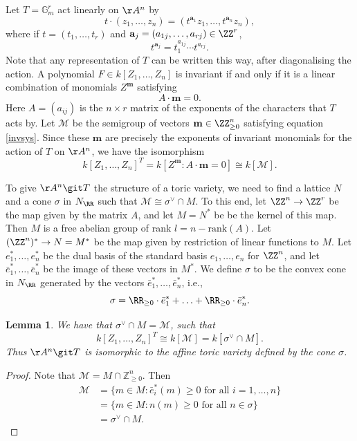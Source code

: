 \documentclass[12pt]{amsart}
\newcommand{\todo}[1]{\noindent  \textcolor{blue}{To do: #1}}
\theoremstyle{plain}
\newtheorem{lemma}[theorem]{Lemma}
\begin{document}
Let $T = \mathbb{G}_m^r$ act linearly on $\AA^n$ by
$$t \cdot (z_1, \ldots, z_n) = (t^{\mathbf{a}_1} z_1, \ldots, t^{\mathbf{a}_n} z_n),$$
where if $t = (t_1, \ldots, t_r)$ and $\mathbf{a}_j = (a_{1j}, \ldots, a_{rj}) \in \ZZ^r$,
$$t^{\mathbf{a}_j} = t_1^{a_{1j}} \cdots t^{a_{rj}}.$$
Note that any representation of $T$ can be written this way, after diagonalising the action.
A polynomial $F \in k[Z_1, \ldots, Z_n]$ is invariant if and only if it is a linear combination of monomials $Z^\mathbf{m}$ satisfying
\begin{equation}\label{invsys}
	A \cdot \mathbf{m} = 0.
\end{equation}
Here $A = (a_{ij})$ is the $n \times r$ matrix of the exponents of the characters that $T$ acts by.
Let $\mathcal{M}$ be the semigroup of vectors $\mathbf{m} \in \ZZ_{\ge 0}^n$ satisfying equation \ref{invsys}.
Since these $\mathbf{m}$ are precisely the exponents of invariant monomials for the action of $T$ on $\AA^n$, we have the isomorphism
$$k[Z_1, \ldots, Z_n]^T = k[Z^\mathbf{m} : A \cdot \mathbf{m} = 0] \cong k[\mathcal{M}].$$

To give $\AA^n \git T$ the structure of a toric variety, we need to find a lattice $N$ and a cone $\sigma$ in $N_\RR$ such that $\mathcal{M} \cong \sigma^\vee \cap M$.
To this end, let $\ZZ^n \to \ZZ^r$ be the map given by the matrix $A$, and let $M = N^*$ be be the kernel of this map.
Then $M$ is a free abelian group of rank $l = n - \mathrm{rank}(A)$.
Let $(\ZZ^n)^* \to N = M^*$ be the map given by restriction of linear functions to $M$.
Let $e_1^*, \ldots, e_n^*$ be the dual basis of the standard basis $e_1, \ldots, e_n$ for $\ZZ^n$, and let $\bar{e}_1^*, \ldots, \bar{e}_n^*$ be the image of these vectors in $M^*$.
We define $\sigma$ to be the convex cone in $N_\RR$ generated by the vectors $\bar{e}_1^*, \ldots, \bar{e}_n^*$, i.e.,
$$\sigma = \RR_{\ge 0} \cdot \bar{e}_1^* + \ldots +\RR_{\ge 0} \cdot \bar{e}_n^*.$$

\begin{lemma}
We have that $\sigma^\vee \cap M = \mathcal{M}$, such that
$$k[Z_1, \ldots, Z_n]^T \cong k[\mathcal{M}] = k[\sigma^\vee \cap M].$$
Thus $\AA^n \git T$ is isomorphic to the affine toric variety defined by the cone $\sigma$.
\end{lemma}
\begin{proof}
Note that $\mathcal{M} = M \cap \mathbb{Z}_{\ge 0}^n$.
Then
\begin{align*}
	\mathcal{M} &= \{m \in M : \bar{e}_i^*(m) \ge 0 \text{ for all } i = 1, \ldots, n\} \\
			&= \{m \in M : n(m) \ge 0 \text{ for all } n \in \sigma\} \\
			&= \sigma^\vee \cap M.
\end{align*}
\end{proof}
\end{document}
